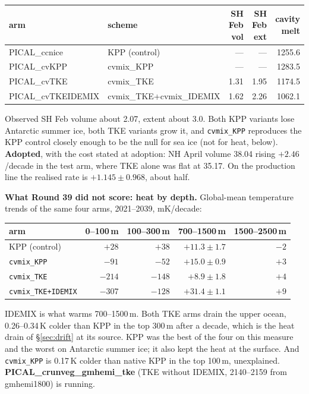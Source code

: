 \documentclass[10pt]{article}
\begin{document}
\begin{center}\small
\begin{tabular}{llrrr}
\toprule
arm & scheme & SH Feb vol & SH Feb ext & cavity melt \\
\midrule
PICAL\_ccnice      & KPP (control)            & ---  & ---  & 1255.6 \\
PICAL\_cvKPP       & cvmix\_KPP               & ---  & ---  & 1283.5 \\
PICAL\_cvTKE       & cvmix\_TKE               & 1.31 & 1.95 & 1174.5 \\
PICAL\_cvTKEIDEMIX & cvmix\_TKE+cvmix\_IDEMIX & 1.62 & 2.26 & 1062.1 \\
\bottomrule
\end{tabular}
\end{center}

Observed SH Feb volume about 2.07, extent about 3.0. Both KPP variants lose Antarctic
summer ice, both TKE variants grow it, and \texttt{cvmix\_KPP} reproduces the KPP control
closely enough to be the null for sea ice (not for heat, below). \textbf{Adopted}, with the cost stated at adoption: NH April
volume 38.04 rising $+2.46$/decade in the test arm, where TKE alone was flat at 35.17. On
the production line the realised rate is $+1.145\pm0.968$, about half.

\textbf{What Round 39 did not score: heat by depth.} Global-mean temperature trends of the same four
arms, 2021--2039, mK/decade:

\begin{center}\small
\begin{tabular}{lrrrr}
\toprule
arm & 0--100\,m & 100--300\,m & 700--1500\,m & 1500--2500\,m \\
\midrule
KPP (control)              & $+28$  & $+38$  & $+11.3\pm1.7$ & $-2$ \\
\texttt{cvmix\_KPP}        & $-91$  & $-52$  & $+15.0\pm0.9$ & $+3$ \\
\texttt{cvmix\_TKE}        & $-214$ & $-148$ & $+8.9\pm1.8$  & $+4$ \\
\texttt{cvmix\_TKE+IDEMIX} & $-307$ & $-128$ & $+31.4\pm1.1$ & $+9$ \\
\bottomrule
\end{tabular}
\end{center}

IDEMIX is what warms 700--1500\,m. Both TKE arms drain the upper ocean, 0.26--0.34\,K colder than
KPP in the top 300\,m after a decade, which is the heat drain of \S\ref{sec:drift} at its source.
KPP was the best of the four on this measure and the worst on Antarctic summer ice; it also kept the
heat at the surface. And \texttt{cvmix\_KPP} is 0.17\,K colder than native KPP in the top 100\,m,
unexplained. \textbf{PICAL\_crunveg\_gmhemi\_tke} (TKE without IDEMIX, 2140--2159 from gmhemi1800) is
running.
\end{document}
